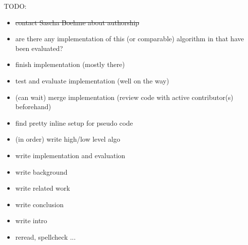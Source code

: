 \documentclass{article}
\begin{document}
TODO:
    \begin{itemize}
       \item \st{contact Sascha Boehme about authorship}
        \item are there any implementation of this (or comparable) algorithm in that have been evaluated?
        \item finish implementation (mostly there)
        \item test and evaluate implementation (well on the way)
        \item (can wait) merge implementation (review code with active contributor(s) beforehand)
        \item find pretty inline setup for pseudo code
        \item (in order) write high/low level algo
        \item write implementation and evaluation
        \item write background
        \item write related work
        \item write conclusion
        \item write intro
        \item reread, spellcheck ...
    \end{itemize}

\end{document}
